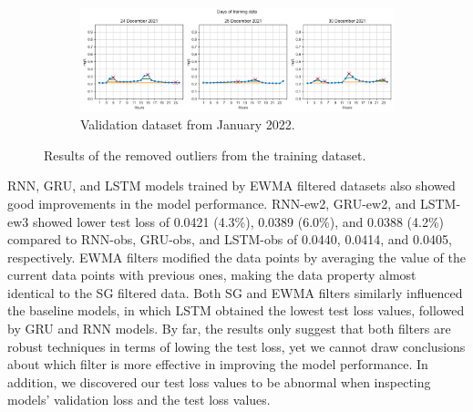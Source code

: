 \begin{figure}[!ht]
  \centering
  \begin{subfigure}[t]{1.0\textwidth}
    \includegraphics[width=\linewidth]{imgs/pre-processing/outliers.png}
    \caption{Validation dataset from January 2022.} \label{fig:outlier-removed-3d}
  \end{subfigure}
\caption{Results of the removed outliers from the training dataset.} \label{fig:outlier-3day}
\end{figure}

RNN, GRU, and LSTM models trained by EWMA filtered datasets also showed good improvements in the model performance. RNN-ew2, GRU-ew2, and LSTM-ew3 showed lower test loss of 0.0421 (4.3\%), 0.0389 (6.0\%), and 0.0388 (4.2\%) compared to RNN-obs, GRU-obs, and LSTM-obs of 0.0440, 0.0414, and 0.0405, respectively. EWMA filters modified the data points by averaging the value of the current data points with previous ones, making the data property almost identical to the SG filtered data. Both SG and EWMA filters similarly influenced the baseline models, in which LSTM obtained the lowest test loss values, followed by GRU and RNN models. By far, the results only suggest that both filters are robust techniques in terms of lowing the test loss, yet we cannot draw conclusions about which filter is more effective in improving the model performance. In addition, we discovered our test loss values to be abnormal when inspecting models' validation loss and the test loss values.


